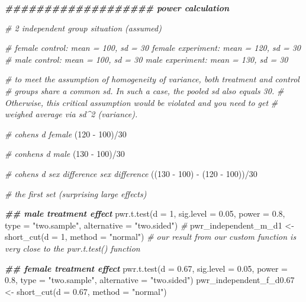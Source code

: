 \documentclass[
]{article}
\newenvironment{Shaded}{\begin{snugshade}}{\end{snugshade}}
\newcommand{\AttributeTok}[1]{\textcolor[rgb]{0.77,0.63,0.00}{#1}}
\newcommand{\CommentTok}[1]{\textcolor[rgb]{0.56,0.35,0.01}{\textit{#1}}}
\newcommand{\DecValTok}[1]{\textcolor[rgb]{0.00,0.00,0.81}{#1}}
\newcommand{\DocumentationTok}[1]{\textcolor[rgb]{0.56,0.35,0.01}{\textbf{\textit{#1}}}}
\newcommand{\FloatTok}[1]{\textcolor[rgb]{0.00,0.00,0.81}{#1}}
\newcommand{\FunctionTok}[1]{\textcolor[rgb]{0.00,0.00,0.00}{#1}}
\newcommand{\NormalTok}[1]{#1}
\newcommand{\OtherTok}[1]{\textcolor[rgb]{0.56,0.35,0.01}{#1}}
\newcommand{\SpecialCharTok}[1]{\textcolor[rgb]{0.00,0.00,0.00}{#1}}
\newcommand{\StringTok}[1]{\textcolor[rgb]{0.31,0.60,0.02}{#1}}
\begin{document}
\begin{Shaded}
\begin{Highlighting}[]
\DocumentationTok{\#\#\#\#\#\#\#\#\#\#\#\#\#\#\#\#\#\#\# power calculation}

\CommentTok{\# 2 independent group situation (assumed)}

\CommentTok{\# female control: mean = 100, sd = 30 female experiment: mean = 120, sd = 30}
\CommentTok{\# male control: mean = 100, sd = 30 male experiment: mean = 130, sd = 30}

\CommentTok{\# to meet the assumption of homogeneity of variance, both treatment and control}
\CommentTok{\# groups share a common sd. In such a case, the pooled sd also equals 30.}
\CommentTok{\# Otherwise, this critical assumption would be violated and you need to get}
\CommentTok{\# weighed average via sd\^{}2 (variance).}

\CommentTok{\# cohen\textquotesingle{}s d female}
\NormalTok{(}\DecValTok{120} \SpecialCharTok{{-}} \DecValTok{100}\NormalTok{)}\SpecialCharTok{/}\DecValTok{30}

\CommentTok{\# conhen\textquotesingle{}s d male}
\NormalTok{(}\DecValTok{130} \SpecialCharTok{{-}} \DecValTok{100}\NormalTok{)}\SpecialCharTok{/}\DecValTok{30}

\CommentTok{\# cohen\textquotesingle{}s d sex difference sex difference}
\NormalTok{((}\DecValTok{130} \SpecialCharTok{{-}} \DecValTok{100}\NormalTok{) }\SpecialCharTok{{-}}\NormalTok{ (}\DecValTok{120} \SpecialCharTok{{-}} \DecValTok{100}\NormalTok{))}\SpecialCharTok{/}\DecValTok{30}


\CommentTok{\# the first set (surprising large effects)}

\DocumentationTok{\#\# male treatment effect}
\FunctionTok{pwr.t.test}\NormalTok{(}\AttributeTok{d =} \DecValTok{1}\NormalTok{, }\AttributeTok{sig.level =} \FloatTok{0.05}\NormalTok{, }\AttributeTok{power =} \FloatTok{0.8}\NormalTok{, }\AttributeTok{type =} \StringTok{"two.sample"}\NormalTok{, }\AttributeTok{alternative =} \StringTok{"two.sided"}\NormalTok{)  }\CommentTok{\# }
\NormalTok{pwr\_independent\_m\_d1 }\OtherTok{\textless{}{-}} \FunctionTok{short\_cut}\NormalTok{(}\AttributeTok{d =} \DecValTok{1}\NormalTok{, }\AttributeTok{method =} \StringTok{"normal"}\NormalTok{)  }\CommentTok{\# our result from our custom function is very close to the pwr.t.test() function}


\DocumentationTok{\#\# female treatment effect}
\FunctionTok{pwr.t.test}\NormalTok{(}\AttributeTok{d =} \FloatTok{0.67}\NormalTok{, }\AttributeTok{sig.level =} \FloatTok{0.05}\NormalTok{, }\AttributeTok{power =} \FloatTok{0.8}\NormalTok{, }\AttributeTok{type =} \StringTok{"two.sample"}\NormalTok{, }\AttributeTok{alternative =} \StringTok{"two.sided"}\NormalTok{)}
\NormalTok{pwr\_independent\_f\_d0}\FloatTok{.67} \OtherTok{\textless{}{-}} \FunctionTok{short\_cut}\NormalTok{(}\AttributeTok{d =} \FloatTok{0.67}\NormalTok{, }\AttributeTok{method =} \StringTok{"normal"}\NormalTok{)}


\end{Highlighting}
\end{Shaded}
\end{document}
